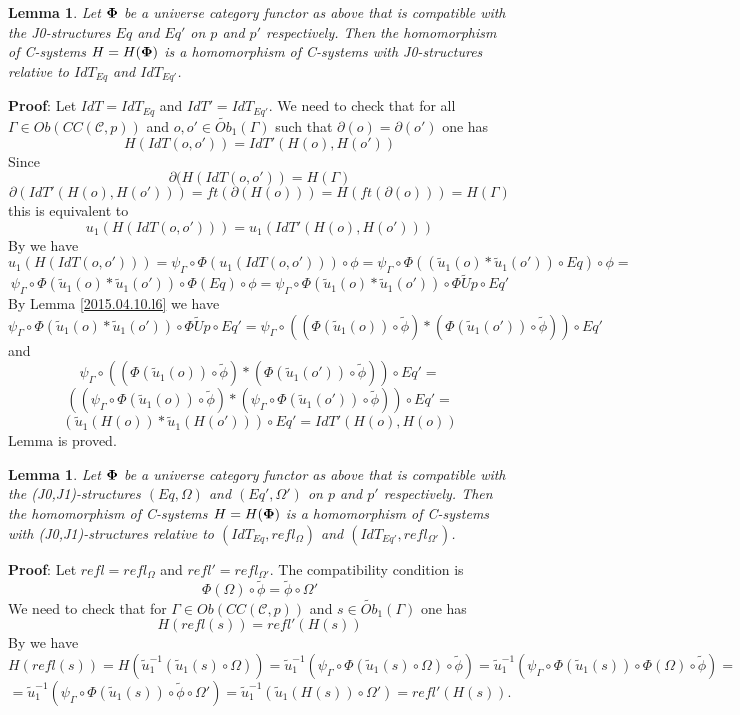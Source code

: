 \documentclass[12pt]{article}
\newenvironment{myproof}{{\bf Proof}:}{\vskip 5mm }
\newtheorem{lemma}[proposition]{Lemma}
\newcommand{\llabel}[1]{\label{#1}}
\newcommand{\wt}{\widetilde}
\begin{document}
\begin{lemma}
\llabel{2015.04.12.l1}
Let ${\bf\Phi}$ be a universe category functor as above that is compatible with the J0-structures $Eq$ and $Eq'$ on $p$ and $p'$ respectively. Then the homomorphism of C-systems $H=H({\bf\Phi})$ is a homomorphism of C-systems with J0-structures relative to $IdT_{Eq}$ and $IdT_{Eq'}$.
\end{lemma}
%
\begin{myproof}
Let $IdT=IdT_{Eq}$ and $IdT'=IdT_{Eq'}$. We need to check that for all $\Gamma\in Ob(CC({\mathcal C},p))$ and $o,o'\in \wt{Ob}_1(\Gamma)$ such that $\partial(o)=\partial(o')$ one has
%
$$H(IdT(o,o'))=IdT'(H(o),H(o'))$$
%
Since 
%
$$\partial(H(IdT(o,o'))=H(\Gamma)$$
%
$$\partial(IdT'(H(o),H(o')))=ft(\partial(H(o)))=H(ft(\partial(o)))=H(\Gamma)$$
%
this is equivalent to
%
$$u_1(H(IdT(o,o')))=u_1(IdT'(H(o),H(o')))$$
%
By \cite[Lemma 6.1(1)]{fromunivwithPi} we have
%
$$u_1(H(IdT(o,o')))=\psi_{\Gamma}\circ\Phi(u_1(IdT(o,o')))\circ\phi=\psi_{\Gamma}\circ\Phi((\wt{u}_1(o)*\wt{u}_1(o'))\circ Eq)\circ\phi=$$
%
$$\psi_{\Gamma}\circ\Phi(\wt{u}_1(o)*\wt{u}_1(o'))\circ \Phi(Eq)\circ\phi=\psi_{\Gamma}\circ\Phi(\wt{u}_1(o)*\wt{u}_1(o'))\circ \Phi\wt{U}p\circ Eq'$$
%
By Lemma \ref{2015.04.10.l6} we have 
%
$$\psi_{\Gamma}\circ\Phi(\wt{u}_1(o)*\wt{u}_1(o'))\circ \Phi\wt{U}p\circ Eq'=\psi_{\Gamma}\circ((\Phi(\wt{u}_1(o))\circ\wt{\phi})*(\Phi(\wt{u}_1(o'))\circ\wt{\phi}))\circ Eq'$$
%
and \cite[Lemma 6.1(2)]{fromunivwithPi}
%
$$\psi_{\Gamma}\circ((\Phi(\wt{u}_1(o))\circ\wt{\phi})*(\Phi(\wt{u}_1(o'))\circ\wt{\phi}))\circ Eq'=$$
$$((\psi_{\Gamma}\circ\Phi(\wt{u}_1(o))\circ\wt{\phi})*(\psi_{\Gamma}\circ\Phi(\wt{u}_1(o'))\circ\wt{\phi}))\circ Eq'=$$
$$(\wt{u}_1(H(o))*\wt{u}_1(H(o')))\circ Eq'=IdT'(H(o),H(o))$$
%
Lemma is proved.
\end{myproof}
%
\begin{lemma}
\llabel{2015.04.12.l2}
Let ${\bf\Phi}$ be a universe category functor as above that is compatible with the (J0,J1)-structures $(Eq,\Omega)$ and $(Eq',\Omega')$ on $p$ and $p'$ respectively. Then the homomorphism of C-systems $H=H({\bf\Phi})$ is a homomorphism of C-systems with (J0,J1)-structures relative to $(IdT_{Eq},refl_{\Omega})$ and $(IdT_{Eq'},refl_{\Omega'})$.
\end{lemma}
%
\begin{myproof}
Let $refl=refl_{\Omega}$ and $refl'=refl_{\Omega'}$. The compatibility condition is
%
$$\Phi(\Omega)\circ\wt{\phi}=\wt{\phi}\circ\Omega'$$
%
We need to check that for $\Gamma\in Ob(CC({\mathcal C},p))$ and $s\in \wt{Ob}_1(\Gamma)$ one has
%
$$H(refl(s))=refl'(H(s))$$
%
By \cite[Lemma 6.1(2)]{fromunivwithPi} we have
%
$$H(refl(s))=H(\wt{u}_1^{-1}(\wt{u}_1(s)\circ\Omega))=\wt{u}_1^{-1}(\psi_{\Gamma}\circ\Phi(\wt{u}_1(s)\circ\Omega)\circ\wt{\phi})=\wt{u}_1^{-1}(\psi_{\Gamma}\circ\Phi(\wt{u}_1(s))\circ\Phi(\Omega)\circ \wt{\phi})=$$
$$=\wt{u}_1^{-1}(\psi_{\Gamma}\circ\Phi(\wt{u}_1(s))\circ\wt{\phi}\circ\Omega')=\wt{u}_1^{-1}(\wt{u}_1(H(s))\circ\Omega')=refl'(H(s)).$$
\end{myproof}
%
\end{document}
